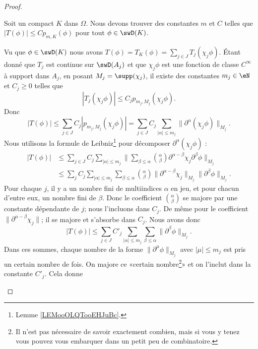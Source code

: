 \begin{proof}
\begin{subproof}
		Soit un compact \( K\) dans \( \Omega\). Nous devons trouver des constantes \( m\) et \( C\) telles que \( |T(\phi)|\leq Cp_{m,K}(\phi)\) pour tout \( \phi\in \swD(K)\).

		Vu que \( \phi\in \swD(K)\) nous avons \( T(\phi)=T_K(\phi)=\sum_{j\in J}T_j(\chi_j\phi)\). Étant donné que \( T_j\) est continue sur \( \swD(A_j)\) et que \( \chi_j\phi\) est une fonction de classe \(  C^{\infty}\) à support dans \( A_j\), en posant \( M_j=\supp(\chi_j)\), il existe des constantes \( m_j\in \eN\) et \( C_j\geq 0\) telles que
		\begin{equation}
			| T_j(\chi_j\phi) |\leq C_jp_{m_j,M_j}(\chi_j\phi).
		\end{equation}
		Donc
		\begin{equation}
			| T(\phi) |\leq \sum_{j\in J}C_j| p_{m_j,M_j}(\chi_j\phi) |=\sum_{j\in J}C_j\sum_{| \alpha |\leq m_j}\| \partial^{\alpha}(\chi_j\phi) \|_{M_j}.
		\end{equation}
		Nous utilisons la formule de Leibniz\footnote{Lemme \ref{LEMooOLQTooEHJuBc}.} pour décomposer \( \partial^{\alpha}(\chi_j\phi)\) :
		\begin{subequations}
			\begin{align}
				| T(\phi) | & \leq\sum_{j\in J}C_j\sum_{| \alpha |\leq m_j}\| \sum_{\beta\leq \alpha}\binom{ \alpha }{ \beta }\partial^{\alpha-\beta}\chi_j\partial^{\beta}\phi \|_{M_j}        \\
				            & \leq \sum_jC_j\sum_{| \alpha |\leq m_j}\sum_{\beta\leq \alpha}\binom{ \alpha }{ \beta }\| \partial^{\alpha-\beta}\chi_j \|_{M_j}\| \partial^{\beta}\phi \|_{M_j}.
			\end{align}
		\end{subequations}
		Pour chaque \( j\), il y a un nombre fini de multiindices \( \alpha\) en jeu, et pour chacun d'entre eux, un nombre fini de \( \beta\). Donc le coefficient \( \binom{ \alpha }{ \beta }\) se majore par une constante dépendante de \( j\); nous l'incluons dans \( C_j\). De même pour le coefficient \( \| \partial^{\alpha-\beta}\chi_j \|\); il se majore et s'absorbe dans \( C_j\). Nous avons donc
		\begin{equation}
			| T(\phi) |\leq \sum_{j\in J}C'_j\sum_{| \alpha |\leq m_j}\sum_{\beta\leq \alpha}\| \partial^{\beta}\phi \|_{M_j}.
		\end{equation}
		Dans ces sommes, chaque nombre de la forme \( \| \partial^{\mu}\phi \|_{M_j}\) avec \( | \mu |\leq m_j\) est pris un certain nombre de fois. On majore ce «certain nombre\footnote{Il n'est pas nécessaire de savoir exactement combien, mais si vous y tenez vous pouvez vous embarquer dans un petit peu de combinatoire.}» et on l'inclut dans la constante \( C'_j\). Cela donne

\end{subproof}
\end{proof}
